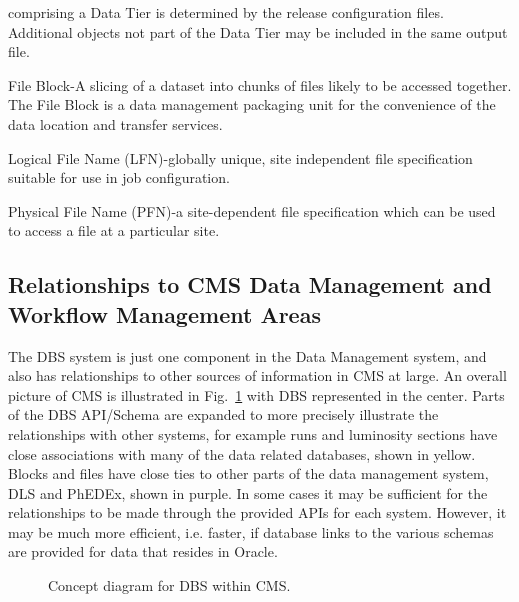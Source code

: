 \documentclass{cmspaper}
\begin{document}
\begin{description}
comprising a Data Tier is determined by the release configuration files.
Additional objects not part of the Data Tier may be included in the same
output file.
\item{File Block}-A slicing of a dataset into chunks of files 
likely to be accessed together.  The File Block is a
data management packaging unit for the convenience of the data
location and transfer services.
\item{Logical File Name (LFN)}-globally unique, site independent
file specification suitable for use in job configuration.
\item{Physical File Name (PFN)}-a site-dependent file specification
which can be used to access a file at a particular site.
\end{description}

\subsection{Relationships to CMS Data Management and Workflow Management Areas}


The DBS system is just one component in the Data Management system, and also has relationships to other sources of information in CMS at large. An overall picture of CMS is illustrated in Fig.~\ref{fig:dbs-context-diagram} with DBS represented in the center. Parts of the DBS API/Schema are expanded to more precisely illustrate the relationships with other systems, for example runs and luminosity sections have close associations with many of the data related databases, shown in yellow. Blocks and files have close ties to other parts of the data management system, DLS and PhEDEx, shown in purple. In some cases it may be sufficient for the relationships to be made through the provided APIs for each system. However, it may be much more efficient, i.e. faster, if database links to the various schemas are provided for data that resides in Oracle.

\begin{figure}[hbtp]
  \begin{center}
    \caption{Concept diagram for DBS within CMS.}
    \label{fig:dbs-context-diagram}
  \end{center}
\end{figure} 
\end{document}
